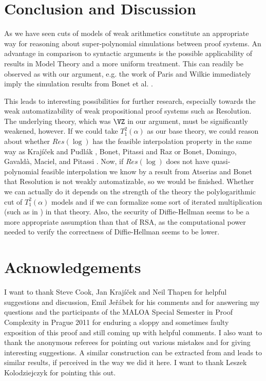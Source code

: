 \documentclass{LMCS}
\begin{document}
\section{Conclusion and Discussion}

As we have seen cuts of models of weak arithmetics constitute an appropriate way for reasoning about
super-polynomial simulations between proof systems. An advantage in comparison to syntactic arguments is the
possible applicability of results in Model Theory and a more uniform treatment. This can readily be observed as
with our argument, e.g. the work of Paris and Wilkie \cite{PW85}\cite{PW87} immediately imply the simulation
results from Bonet et al. \cite{BDGMP04}.

This leads to interesting possibilities for further research, especially towards the weak automatizability of
weak propositional proof systems such as Resolution. The underlying theory, which was $\VZ$ in our argument,
must be significantly weakened, however. If we could take $T^2_1(\alpha)$ as our base theory, we could reason
about whether $Res(\log)$ has the feasible interpolation property in the same way as Kraj\' i\v cek and Pudl\'
ak \cite{KP98}, Bonet, Pitassi and Raz \cite{BPR00} or Bonet, Domingo, Gavald\`a, Maciel, and Pitassi
\cite{BDGMP04}. Now, if $Res(\log)$ does not have quasi-polynomial feasible interpolation we know by a result
from Atserias and Bonet \cite{AB04} that Resolution is not weakly automatizable, so we would be finished.
Whether we can actually do it depends on the strength of the theory the polylogarithmic cut of $T^2_1(\alpha)$
models and if we can formalize some sort of iterated multiplication (such as in \cite{ABH02}) in that theory.
Also, the security of Diffie-Hellman seems to be a more appropriate assumption than that of RSA, as the
computational power needed to verify the correctness of Diffie-Hellman seems to be lower.




\section{Acknowledgements}

I want to thank Steve Cook, Jan Kraj\' i\v cek and Neil Thapen for helpful suggestions and discussion, Emil Je\v
r\' abek for his comments and for answering my questions and the participants of the MALOA Special Semester in
Proof Complexity in Prague 2011 for enduring a sloppy and sometimes faulty exposition of this proof and still
coming up with helpful comments. I also want to thank the anonymous referees for pointing out various mistakes
and for giving interesting suggestions.
A similar construction can be extracted from \cite{Zam97} and leads to similar results, if perceived in the way we did it here. I want to thank Leszek Kolodziejczyk for pointing this out.
\end{document}
